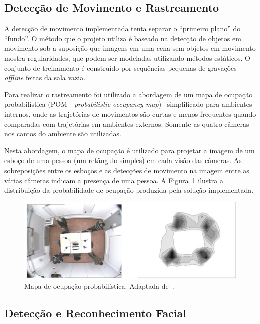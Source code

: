 \subsection{Detecção de Movimento e Rastreamento}

A detecção de movimento implementada tenta separar o ``primeiro plano'' do ``fundo''. O método que o projeto utiliza é baseado na detecção de objetos em movimento sob a suposição que imagens em uma cena sem objetos em movimento mostra regularidades, que podem ser modeladas utilizando métodos estáticos. O conjunto de treinamento é construído por sequências pequenas de gravações \textit{offline} feitas da sala vazia.

Para realizar o rastreamento foi utilizado a abordagem de um mapa de ocupação probabilística (POM - \textit{probabilistic occupancy map})~\cite{pom} simplificado para ambientes internos, onde as trajetórias de movimentos são curtas e menos frequentes quando comparadas com trajetórias em ambientes externos. Somente as quatro câmeras nos cantos do ambiente são utilizadas.

Nesta abordagem, o mapa de ocupação é utilizado para projetar a imagem de um esboço de uma pessoa (um retângulo simples) em cada visão das câmeras.  As sobreposições entre os esboços e as detecções de movimento na imagem entre as várias câmeras indicam a presença de uma pessoa. A Figura~\ref{fig:pom} ilustra a distribuição da probabilidade de ocupação produzida pela solução implementada.

\begin{figure}[hbt]
		\begin{center}
			\includegraphics[scale=0.5]{figuras/3.TrabalhosCorrelatos/pom.png}
		\end{center}
		\caption{Mapa de ocupação probabilística. Adaptada de~\cite{salah}.}
		\label{fig:pom}
	\end{figure}

\subsection{Detecção e Reconhecimento Facial}

